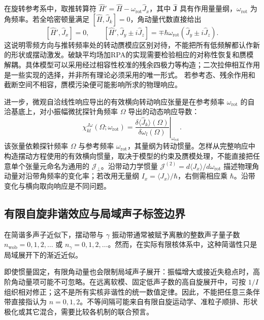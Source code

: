 在旋转参考系中，取推转算符 $\hat H'=\hat H-\omega_{\mathrm{rot}}\hat J_x$，其中 $\hat{\mathbf J}$ 具有作用量量纲，$\omega_{\mathrm{rot}}$ 为角频率。若全哈密顿量满足 $[\hat H,\hat J_k]=0$，角动量代数直接给出
\begin{equation}\label{eq:3-6-rotational-commutators}
[\hat H',\hat J_x]=0,\qquad
[\hat H',\hat J_y\pm i\hat J_z]
=\mp\hbar\omega_{\mathrm{rot}}(\hat J_y\pm i\hat J_z).
\end{equation}
这说明零频方向与推转频率处的转动赝模应区别对待，不能把所有低频解都认作新的形状或摆动激发。破缺平均场加RPA的实现需要检验相应的对称性恢复和赝模解耦。具体模型可以采用经过相容性校准的残余四极力等构造；二次拉伸相互作用是一些实现的选择，并非所有理论必须采用的唯一形式。\cite{matsuzaki-2004-nuclear-inertia-and-wobbling,kvasil-2006-dy156-yb162-crpa-wobbling} 若参考态、残余作用和截断空间不相容，赝模污染便可能影响所求的物理响应。

进一步，微观自洽线性响应导出的有效横向转动响应张量是在参考频率 $\omega_{\mathrm{rot}}$ 的自洽基底上，对小振幅微扰探针角频率 $\Omega$ 导出的动态响应导数：
\begin{equation}\label{eq:3-6-freq-dependent-inertia}
\chi_{kl}^{J\omega}(\Omega; \omega_{\mathrm{rot}}) = \left. \frac{\delta \langle \hat{J}_k \rangle(\Omega)}{\delta \omega_l(\Omega)} \right|_{\omega_{\mathrm{rot}}} .
\end{equation}
该张量依赖探针频率 $\Omega$ 与参考频率 $\omega_{\mathrm{rot}}$，其量纲为转动惯量。怎样从完整响应中构造摆动方程使用的有效横向惯量，取决于模型的约束及赝模处理，不能直接把任意单个张量元命名为通用的 $\mathcal J_\perp$。沿带动力学惯量 $\mathcal{J}^{(2)}=d\langle J_x\rangle/d\omega_{\mathrm{rot}}$ 描述物理角动量对沿带角频率的变化率；若改用无量纲 $I_x=\langle J_x\rangle/\hbar$，右侧需相应乘 $\hbar$。沿带变化与横向取向响应是不同问题。\cite{matsuzaki-2004-nuclear-inertia-and-wobbling}

\subsection{有限自旋非谐效应与局域声子标签边界}\label{sec:3-6-5}

在简谐多声子近似下，摆动带与 $\gamma$ 振动带通常被赋予离散的整数声子量子数 $n_{\mathrm{wob}} = 0, 1, 2, \dots$ 或 $n_\gamma = 0, 1, 2, \dots$。然而，在实际有限核体系中，这种简谐性只是局域展开下的渐近近似。

即使惯量固定，有限角动量也会限制局域声子展开：振幅增大或接近失稳点时，高阶角动量项可能不可忽略。在远离软模、固定低声子数的高自旋展开中，可按 $1/I$ 组织相对修正；这不是所有实核非谐性的统一数值定律。因此，不能把任意三条伴带直接指认为 $n=0,1,2$。不等间隔可能来自有限自旋运动学、准粒子顺排、形状极化或其它混合，需要比较各机制的联合预言。

